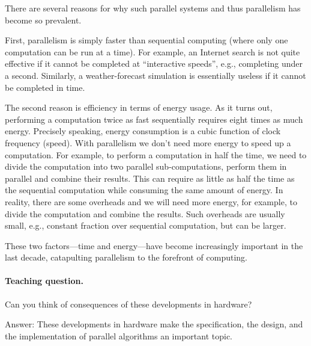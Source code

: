 


There are several reasons for why such parallel systems and thus
parallelism has become so prevalent.
%


First, parallelism is simply faster than sequential computing (where
only one computation can be run at a time).
%
For example, an Internet search is not quite effective if it cannot be
completed at ``interactive speeds'', e.g., completing under a second.
%
Similarly, a weather-forecast simulation is essentially useless if it
cannot be completed in time.

The second reason is efficiency in terms of energy usage.
%
As it turns out, performing a computation twice as fast sequentially
requires eight times as much energy.  
%
Precisely speaking, energy
consumption is a cubic function of clock frequency (speed).  With
parallelism we don't need more energy to speed up a computation. 
%
For example, to perform a computation in half the time, we need to
divide the computation into two parallel sub-computations, perform
them in parallel and combine their results.  This can require as
little as half the time as the sequential computation while consuming
the same amount of energy.
%
In reality, there are some overheads and we will need more energy, for
example, to divide the computation and combine the results.
Such overheads are usually small, e.g., constant fraction over
sequential computation, but can be larger. 

These two factors---time and energy---have become increasingly
important in the last decade, catapulting parallelism to the forefront
of computing.

\paragraph{Teaching question.}
Can you think of consequences of these developments in hardware?  

Answer:
These developments in hardware make the specification, the design, and
the implementation of parallel algorithms an important topic.

